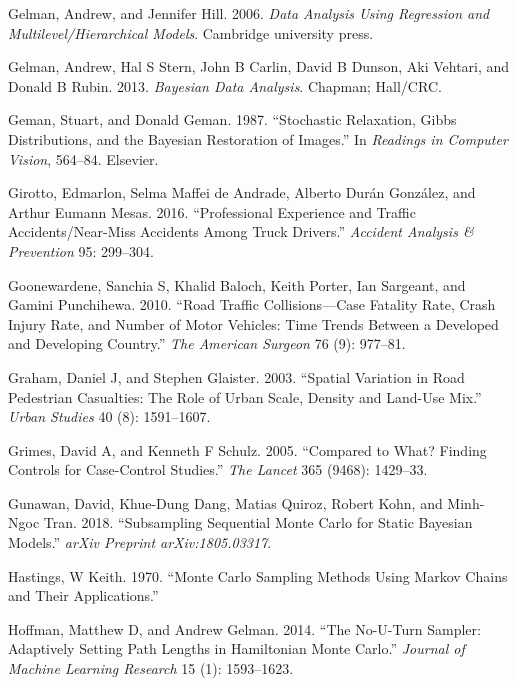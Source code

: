 \documentclass[12pt]{book}
\numberwithin{equation}{chapter}
\begin{document}
\leavevmode\hypertarget{ref-gelman2006data}{}%
Gelman, Andrew, and Jennifer Hill. 2006. \emph{Data Analysis Using Regression and Multilevel/Hierarchical Models}. Cambridge university press.

\leavevmode\hypertarget{ref-gelman2013bayesian}{}%
Gelman, Andrew, Hal S Stern, John B Carlin, David B Dunson, Aki Vehtari, and Donald B Rubin. 2013. \emph{Bayesian Data Analysis}. Chapman; Hall/CRC.

\leavevmode\hypertarget{ref-geman1987stochastic}{}%
Geman, Stuart, and Donald Geman. 1987. ``Stochastic Relaxation, Gibbs Distributions, and the Bayesian Restoration of Images.'' In \emph{Readings in Computer Vision}, 564--84. Elsevier.

\leavevmode\hypertarget{ref-girotto2016professional}{}%
Girotto, Edmarlon, Selma Maffei de Andrade, Alberto Durán González, and Arthur Eumann Mesas. 2016. ``Professional Experience and Traffic Accidents/Near-Miss Accidents Among Truck Drivers.'' \emph{Accident Analysis \& Prevention} 95: 299--304.

\leavevmode\hypertarget{ref-goonewardene2010road}{}%
Goonewardene, Sanchia S, Khalid Baloch, Keith Porter, Ian Sargeant, and Gamini Punchihewa. 2010. ``Road Traffic Collisions---Case Fatality Rate, Crash Injury Rate, and Number of Motor Vehicles: Time Trends Between a Developed and Developing Country.'' \emph{The American Surgeon} 76 (9): 977--81.

\leavevmode\hypertarget{ref-graham2003spatial}{}%
Graham, Daniel J, and Stephen Glaister. 2003. ``Spatial Variation in Road Pedestrian Casualties: The Role of Urban Scale, Density and Land-Use Mix.'' \emph{Urban Studies} 40 (8): 1591--1607.

\leavevmode\hypertarget{ref-grimes2005compared}{}%
Grimes, David A, and Kenneth F Schulz. 2005. ``Compared to What? Finding Controls for Case-Control Studies.'' \emph{The Lancet} 365 (9468): 1429--33.

\leavevmode\hypertarget{ref-gunawan2018subsampling}{}%
Gunawan, David, Khue-Dung Dang, Matias Quiroz, Robert Kohn, and Minh-Ngoc Tran. 2018. ``Subsampling Sequential Monte Carlo for Static Bayesian Models.'' \emph{arXiv Preprint arXiv:1805.03317}.

\leavevmode\hypertarget{ref-hastings1970monte}{}%
Hastings, W Keith. 1970. ``Monte Carlo Sampling Methods Using Markov Chains and Their Applications.''

\leavevmode\hypertarget{ref-hoffman2014no}{}%
Hoffman, Matthew D, and Andrew Gelman. 2014. ``The No-U-Turn Sampler: Adaptively Setting Path Lengths in Hamiltonian Monte Carlo.'' \emph{Journal of Machine Learning Research} 15 (1): 1593--1623.
\end{document}
